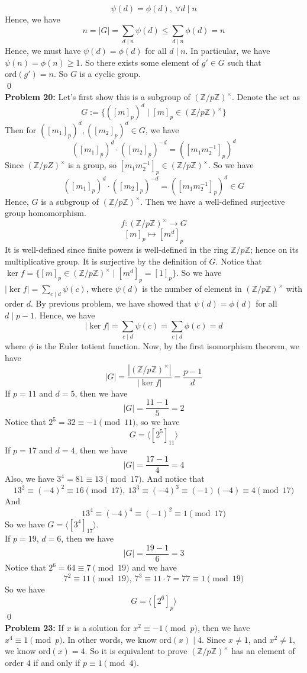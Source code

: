 \documentclass[12pt]{amsart}
\newcommand{\Z}{\mathbb{Z}}
\newcommand{\ord}{\mathrm{ord}}
\begin{document}
\[\psi(d)=\phi(d),\ \forall d\mid n\]
Hence, we have 
\[n=|G|=\sum_{d\mid n}\psi(d)\leq \sum_{d\mid n}\phi(d)=n\]
Hence, we must have $\psi(d)=\phi(d)$ for all $d\mid n$. In particular, we have $\psi(n)=\phi(n)\geq 1$. So there exists some element of $g'\in G$ such that $\ord(g')=n$. So $G$ is a cyclic group.
\\\qed\\
\textbf{Problem 20:}
Let's first show this is a subgroup of $(\Z/p\Z)^\times$. Denote the set as 
\[G:=\{([m]_p)^d\mid [m]_p\in (\Z/p\Z)^\times \}\]
Then for $([m_1]_p)^d,([m_2]_p)^d\in G$, we have 
\[([m_1]_p)^d\cdot ([m_2]_p)^{-d}=([m_1m_2^{-1}]_p)^d\]
Since $(\Z/pZ)^\times$ is a group, so $[m_1m_2^{-1}]_p\in (\Z/p\Z)^\times $. So we have $$([m_1]_p)^d\cdot ([m_2]_p)^{-d}=([m_1m_2^{-1}]_p)^d\in G$$
Hence, $G$ is a subgroup of $(\Z/p\Z)^\times $. Then we have a well-defined surjective group homomorphism.
\[f: (\Z/p\Z)^\times \to G\]
\[[m]_p\mapsto [m^d]_p\]
It is well-defined since finite powers is well-defined in the ring $\Z/p\Z$; hence on its multiplicative group. It is surjective by the definition of $G$. Notice that $\ker f=\{[m]_p\in (\Z/p\Z)^\times \mid [m^d]_p=[1]_p\}$. So we have $|\ker f|=\sum_{c\mid d}\psi(c)$, where $\psi(d)$ is the number of element in $(\Z/p\Z)^\times $ with order $d$. By previous problem, we have showed that $\psi(d)=\phi(d)$ for all $d\mid p-1$. Hence, we have 
\[|\ker f|=\sum_{c\mid d}\psi(c)=\sum_{c\mid d}\phi(c)=d\]
where $\phi$ is the Euler totient function. Now, by the first isomorphism theorem, we have 
\[|G|=\frac{|(\Z/p\Z)^\times |}{|\ker f|}=\frac{p-1}{d}\] 
If $p=11$ and $d=5$, then we have 
\[|G|=\frac{11-1}{5}=2\]
Notice that $2^5=32\equiv -1\pmod{11}$, so we have 
\[G=\langle [2^5]_{11}\rangle\]
If $p=17$ and $d=4$, then we have 
\[|G|=\frac{17-1}{4}=4\]
Also, we have $3^4=81\equiv 13\pmod {17}$. And notice that 
\[13^2\equiv (-4)^2\equiv 16\pmod {17},\ 13^3\equiv (-4)^3\equiv (-1)(-4)\equiv 4\pmod{17}\]
And 
\[13^4\equiv (-4)^4\equiv (-1)^2\equiv 1\pmod {17}\]
So we have $G=\langle[3^4]_{17}\rangle$.\\
If $p=19$, $d=6$, then we have 
\[|G|=\frac{19-1}{6}=3\]
Notice that $2^6=64\equiv 7\pmod{19}$ and we have 
\[7^2\equiv 11\pmod{19},\ 7^3\equiv 11\cdot 7=77\equiv 1\pmod{19}\]
So we have 
\[G=\langle[2^6]_p\rangle\]
\qed\\
\textbf{Problem 23:} If $x$ is a solution for $x^2\equiv -1\pmod p$, then we have $x^4\equiv 1\pmod p$. In other words, we know $\ord(x)\mid 4$. Since $x\neq 1$, and $x^2\neq 1$, we know $\ord(x)=4$. So it is equivalent to prove $(\Z/p\Z)^\times$ has an element of order $4$ if and only if $p\equiv 1\pmod4$.\\
\end{document}
